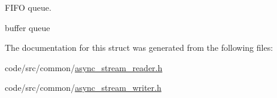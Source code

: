 F\+I\+FO queue. 

buffer queue 

The documentation for this struct was generated from the following files\+:\begin{DoxyCompactItemize}
\item 
code/src/common/\hyperlink{async__stream__reader_8h}{async\+\_\+stream\+\_\+reader.\+h}\item 
code/src/common/\hyperlink{async__stream__writer_8h}{async\+\_\+stream\+\_\+writer.\+h}\end{DoxyCompactItemize}
